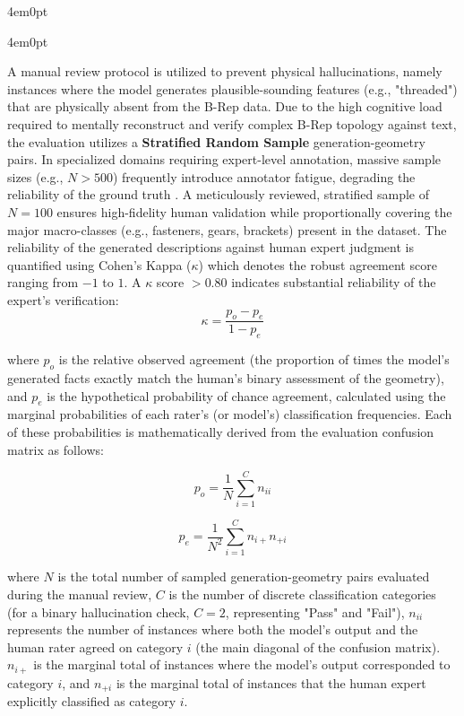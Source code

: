 \begin{indentedblock}{4em}{0pt}
\begin{indentedblock}{4em}{0pt}
						\begin{sloppypar}
							A manual review protocol is utilized to prevent physical hallucinations, namely instances where the model generates plausible-sounding features (e.g., "threaded") that are physically absent from the B-Rep data. Due to the high cognitive load required to mentally reconstruct and verify complex B-Rep topology against text, the evaluation utilizes a \textbf{Stratified Random Sample} generation-geometry pairs. In specialized domains requiring expert-level annotation, massive sample sizes (e.g., $N > 500$) frequently introduce annotator fatigue, degrading the reliability of the ground truth \parencite{deep_learning_goodfellow}. A meticulously reviewed, stratified sample of $N=100$ ensures high-fidelity human validation while proportionally covering the major macro-classes (e.g., fasteners, gears, brackets) present in the dataset. The reliability of the generated descriptions against human expert judgment is quantified using Cohen's Kappa ($\kappa$) which denotes the robust agreement score ranging from $-1$ to $1$. A $\kappa$ score $> 0.80$ indicates substantial reliability of the expert's verification:
							\begin{equation}
								\kappa = \frac{p_o - p_e}{1 - p_e}
							\end{equation}
							
							where $p_o$ is the relative observed agreement (the proportion of times the model's generated facts exactly match the human's binary assessment of the geometry), and $p_e$ is the hypothetical probability of chance agreement, calculated using the marginal probabilities of each rater's (or model's) classification frequencies. Each of these probabilities is mathematically derived from the evaluation confusion matrix as follows:
							
							\begin{equation}
								p_o = \frac{1}{N} \sum_{i=1}^{C} n_{ii}
							\end{equation}
							
							\begin{equation}
								p_e = \frac{1}{N^2} \sum_{i=1}^{C} n_{i+} n_{+i}
							\end{equation}
							
							where $N$ is the total number of sampled generation-geometry pairs evaluated during the manual review, $C$ is the number of discrete classification categories (for a binary hallucination check, $C = 2$, representing "Pass" and "Fail"), $n_{ii}$ represents the number of instances where both the model's output and the human rater agreed on category $i$ (the main diagonal of the confusion matrix). $n_{i+}$ is the marginal total of instances where the model's output corresponded to category $i$, and $n_{+i}$ is the marginal total of instances that the human expert explicitly classified as category $i$.
								

\end{sloppypar}
\end{indentedblock}
\end{indentedblock}
